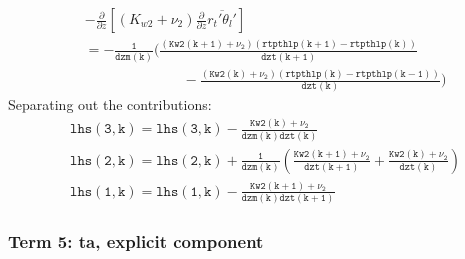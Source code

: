 \documentclass[11pt,fleqn]{article}
\newcommand{\ptlder}[2]{\frac{\partial #1}{\partial #2}}
\begin{document}
\begin{equation}
\begin{split}
& - \ptlder{}{z} \left[ \left( K_{w2} + \nu_2 \right)
                        \ptlder{}{z} \overline{r_t'\theta_l'}
                 \right]  \\
 &= \mathtt{
    -\frac{1}{dzm(k)}
     \bigg( \frac{ \left( Kw2(k+1) + \nu_2 \right)
                   \left( rtpthlp(k+1) - rtpthlp(k) \right)} {dzt(k+1)}  }  \\
 &  \mathtt{ \qquad \qquad \qquad \quad
           -\frac{ \left( Kw2(k) + \nu_2 \right)
                   \left( rtpthlp(k) - rtpthlp(k-1) \right)} {dzt(k)}
     \bigg)
    }
\end{split}
\end{equation}
%
Separating out the contributions:
%
\begin{equation}
\begin{split}
&\mathtt{lhs(3,k) = lhs(3,k) - \frac{Kw2(k)+\nu_2}{dzm(k)dzt(k)} } \\
&\mathtt{lhs(2,k) = lhs(2,k) + \frac{1}{dzm(k)}
                               \left(   \frac{Kw2(k+1)+\nu_2}{dzt(k+1)} 
                                      + \frac{Kw2(k)+\nu_2}{dzt(k)} \right) } \\
&\mathtt{lhs(1,k) = lhs(1,k) - \frac{Kw2(k+1)+\nu_2}{dzm(k)dzt(k+1)} }
\end{split}
\end{equation}

\subsubsection{Term 5:  ta, explicit component}
\end{document}
